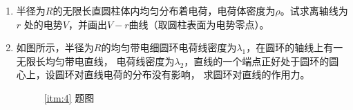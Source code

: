 \documentclass[UTF-8]{ctexart}
\begin{document}
\begin{enumerate}
    
    
    \item 半径为\(R\)的无限长直圆柱体内均匀分布着电荷，电荷体密度为\(\rho\)。试求离轴线为\(r\)
        处的电势\(V\)，并画出\(V-r\)曲线（取圆柱表面为电势零点）。
    
    \item \label{itm:4} 如图所示，半径为\(R\)的均匀带电细圆环电荷线密度为\(\lambda_1\)，在圆环的轴线上有一无限长均匀带电直线，
        电荷线密度为\(\lambda_2\)，直线的一个端点正好处于圆环的圆心上，设圆环对直线电荷的分布没有影响，
        求圆环对直线的作用力。
        \begin{figure}[htb]
            \centering
            \begin{minipage}[b]{0.4\textwidth}
                \centering
                \caption{\ref{itm:4} 题图}
            \end{minipage}
        \end{figure}
    

\end{enumerate}
\end{document}

